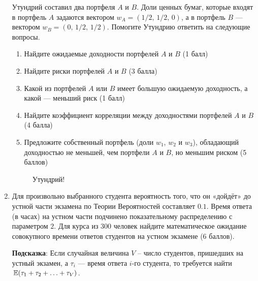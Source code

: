 \begin{enumerate}
Утундрий составил два портфеля $A$ и $B$. Доли ценных бумаг, которые входят
в портфель $A$ задаются вектором $w_A = (1/2, \, 1/2, \, 0)$, а в портфель $B$ —
вектором $w_B = (0, \, 1/2, \, 1/2)$.
Помогите Утундрию ответить на следующие вопросы.
\begin{enumerate}
  \item Найдите ожидаемые доходности портфелей $A$ и $B$ (1 балл)
  \item Найдите риски портфелей $A$ и $B$ (3 балла)
  \item Какой из портфелей $A$ или $B$ имеет большую ожидаемую доходность,
  а какой — меньший риск (1 балл)
  \item Найдите коэффициент корреляции между доходностями портфелей $A$ и $B$ (4 балла)
  \item Предложите собственный портфель (доли $w_{1}$, $w_{2}$ и $w_{3}$),
  обладающий доходностью не меньшей, чем портфели $A$ и $B$, но меньшим риском (5 баллов)
\end{enumerate}

\begin{figure}[h]
    \noindent{}
    \caption{Утундрий!}
    \label{ut2018}
\end{figure}


    \item Для произвольно выбранного студента вероятность того, что он «дойдёт»
    до устной части экзамена по Теории Вероятностей составляет $0.1$. Время
    ответа (в часах) на устном части подчинено показательному распределению с
    параметром $2$. Для курса из $300$ человек найдите математическое ожидание
    совокупного времени ответов студентов на устном экзамене (6 баллов).

    \textbf{Подсказка}: Если случайная величина $V$ – число студентов,
    пришедших на устный экзамен, а $\tau_{i}$ — время ответа $i$-го студента,
    то требуется найти $\operatorname{\mathbb{E}}(\tau_{1}+\tau_{2}+ \ldots +\tau_{V})$.


\end{enumerate}


